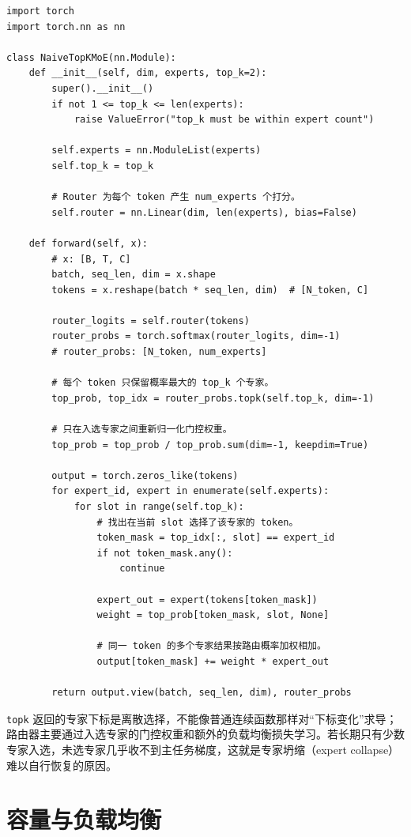 \begin{lstlisting}
import torch
import torch.nn as nn

class NaiveTopKMoE(nn.Module):
    def __init__(self, dim, experts, top_k=2):
        super().__init__()
        if not 1 <= top_k <= len(experts):
            raise ValueError("top_k must be within expert count")

        self.experts = nn.ModuleList(experts)
        self.top_k = top_k

        # Router 为每个 token 产生 num_experts 个打分。
        self.router = nn.Linear(dim, len(experts), bias=False)

    def forward(self, x):
        # x: [B, T, C]
        batch, seq_len, dim = x.shape
        tokens = x.reshape(batch * seq_len, dim)  # [N_token, C]

        router_logits = self.router(tokens)
        router_probs = torch.softmax(router_logits, dim=-1)
        # router_probs: [N_token, num_experts]

        # 每个 token 只保留概率最大的 top_k 个专家。
        top_prob, top_idx = router_probs.topk(self.top_k, dim=-1)

        # 只在入选专家之间重新归一化门控权重。
        top_prob = top_prob / top_prob.sum(dim=-1, keepdim=True)

        output = torch.zeros_like(tokens)
        for expert_id, expert in enumerate(self.experts):
            for slot in range(self.top_k):
                # 找出在当前 slot 选择了该专家的 token。
                token_mask = top_idx[:, slot] == expert_id
                if not token_mask.any():
                    continue

                expert_out = expert(tokens[token_mask])
                weight = top_prob[token_mask, slot, None]

                # 同一 token 的多个专家结果按路由概率加权相加。
                output[token_mask] += weight * expert_out

        return output.view(batch, seq_len, dim), router_probs
\end{lstlisting}

\texttt{topk} 返回的专家下标是离散选择，不能像普通连续函数那样对“下标变化”求导；路由器主要通过入选专家的门控权重和额外的负载均衡损失学习。若长期只有少数专家入选，未选专家几乎收不到主任务梯度，这就是专家坍缩（expert collapse）难以自行恢复的原因。

\section{容量与负载均衡}

